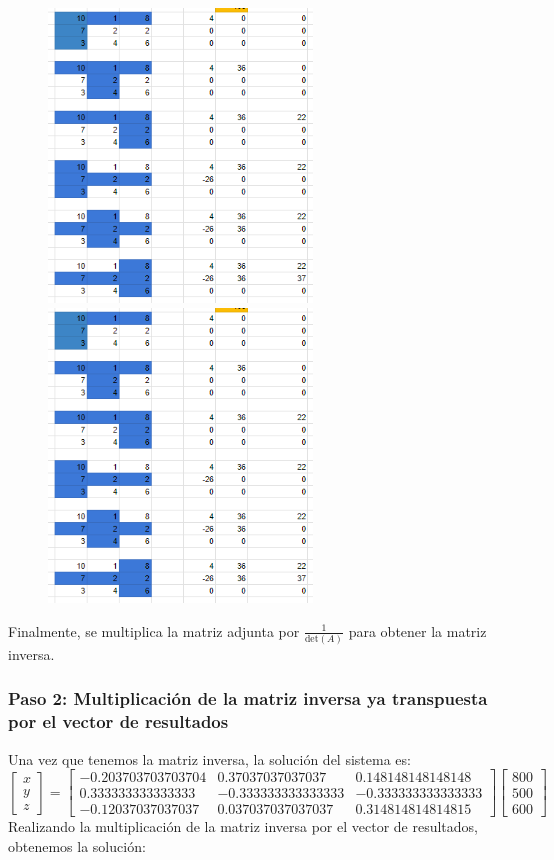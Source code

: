 \documentclass[]{article}
\begin{document}
     \begin{figure}[!ht]
     	\centering
     	\includegraphics[width=7cm]{adjunta1.png}
     	\includegraphics[width=7cm]{adjunta2.png}
     \end{figure}
     
	Finalmente, se multiplica la matriz adjunta por \(\frac{1}{\text{det}(A)}\) para obtener la matriz inversa.
	
	\subsubsection*{Paso 2: Multiplicación de la matriz inversa ya transpuesta por el vector de resultados}
	Una vez que tenemos la matriz inversa, la solución del sistema es:
	\[
	\begin{bmatrix}
		x \\
		y \\
		z
	\end{bmatrix}
	=
	\begin{bmatrix}
		-0.203703703703704 & 0.37037037037037 & 0.148148148148148 \\
		0.333333333333333 & -0.333333333333333 & -0.333333333333333 \\
		-0.12037037037037 & 0.037037037037037 & 0.314814814814815
	\end{bmatrix}
	\begin{bmatrix}
		800 \\
		500 \\
		600
	\end{bmatrix}
	\]
	Realizando la multiplicación de la matriz inversa por el vector de resultados, obtenemos la solución:
	
\end{document}
